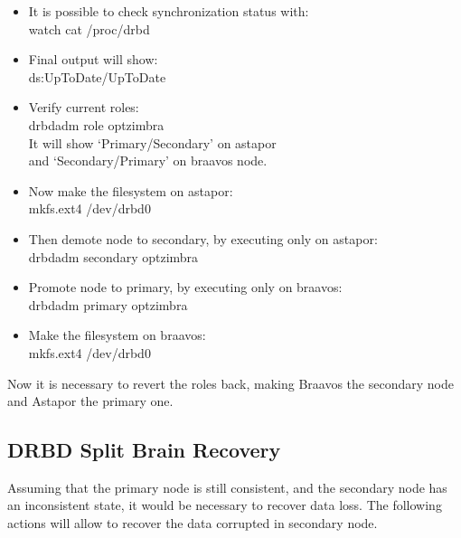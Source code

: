 \documentclass[a4paper, 12pt]{book}
\begin{document}
\begin{itemize}
	\item It is possible to check synchronization status with:\\
		watch cat /proc/drbd

	\item Final output will show:\\
		ds:UpToDate/UpToDate

	\item Verify current roles:\\
		drbdadm role optzimbra\\
		It will show `Primary/Secondary' on astapor \\
		and `Secondary/Primary' on braavos node.

	\item Now make the filesystem on astapor:\\
		mkfs.ext4 /dev/drbd0

	\item Then demote node to secondary, by executing only on astapor:\\
		drbdadm secondary optzimbra

	\item Promote node to primary, by executing only on braavos:\\
		drbdadm primary optzimbra

	\item Make the filesystem on braavos:\\
		mkfs.ext4 /dev/drbd0

\end{itemize}

\noindent Now it is necessary to revert the roles back, making Braavos the secondary node and Astapor the primary one.


\subsection{DRBD Split Brain Recovery}
\label{sec:splitbrain}

\noindent Assuming that the primary node is still consistent, and the secondary node has an inconsistent state, it would be necessary to recover data loss. The following actions will allow to recover the data corrupted in secondary node.
\end{document}

